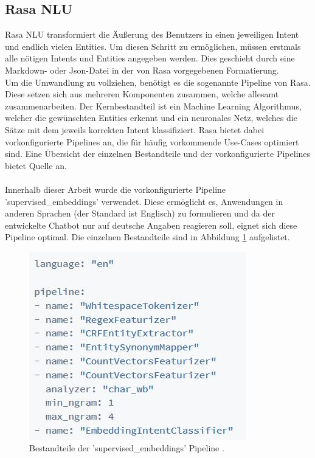 \subsection{Rasa NLU}\label{sec:flownlu}
Rasa NLU transformiert die Äußerung des Benutzers in einen jeweiligen Intent und endlich vielen Entities. Um diesen Schritt zu ermöglichen, müssen erstmals alle nötigen Intents und Entities angegeben werden. Dies geschieht durch eine Markdown- oder Json-Datei in der von Rasa vorgegebenen Formatierung.\\
Um die Umwandlung zu vollziehen, benötigt es die sogenannte Pipeline von Rasa. Diese setzen sich aus mehreren Komponenten zusammen, welche allesamt zusammenarbeiten. Der Kernbestandteil ist ein Machine Learning Algorithmus, welcher die gewünschten Entities erkennt und ein neuronales Netz, welches die Sätze mit dem jeweils korrekten Intent klassifiziert. Rasa bietet dabei vorkonfigurierte Pipelines an, die für häufig vorkommende Use-Cases optimiert sind. Eine Übersicht der einzelnen Bestandteile und der vorkonfigurierte Pipelines bietet Quelle \cite{nlunn} an.\\
\\
Innerhalb dieser Arbeit wurde die vorkonfigurierte Pipeline 'supervised\_embeddings' verwendet. Diese ermöglicht es, Anwendungen in anderen Sprachen (der Standard ist Englisch) zu formulieren und da der entwickelte Chatbot nur auf deutsche Angaben reagieren soll, eignet sich diese Pipeline optimal. Die einzelnen Bestandteile sind in Abbildung \ref{se} aufgelistet.
\begin{figure}[htbp]
	\centerline{\includegraphics[width=0.5\linewidth]{figures/se.jpg}}
	\caption{Bestandteile der 'supervised\_embeddings' Pipeline \cite{nlunn}.}
	\label{se}
\end{figure}
